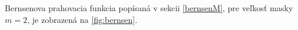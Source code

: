 \documentclass[a4paper,11pt,oneside]{article}%
\begin{document}
Bernsenova prahovacia funkcia popísaná v sekcii \ref{bernsenM}, pre veľkosť masky $m = 2$, je zobrazená na \ref{fig:bernsen}.

\begin{figure}[H]  
    \hspace{5px}

\end{figure}
\end{document}
